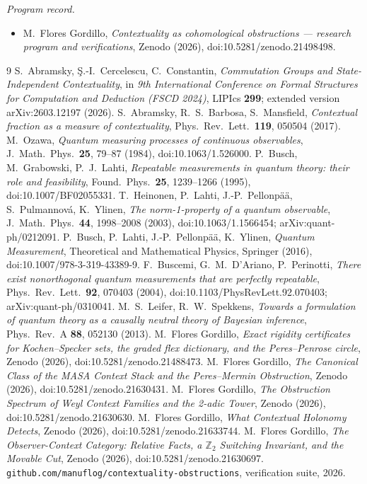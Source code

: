 \documentclass[11pt]{article}
\theoremstyle{definition}
\theoremstyle{remark}
\begin{document}
\noindent\emph{Program record.}
\begin{itemize}
\item M.~Flores Gordillo, \emph{Contextuality as cohomological obstructions --- research program and verifications}, Zenodo (2026), doi:10.5281/zenodo.21498498.
\end{itemize}

\begin{thebibliography}{9}
 S.~Abramsky, \c{S}.-I.~Cercelescu, C.~Constantin, \emph{Commutation Groups and
State-Independent Contextuality}, in \emph{9th International Conference on Formal Structures for
Computation and Deduction (FSCD 2024)}, LIPIcs \textbf{299}; extended version arXiv:2603.12197
(2026).
 S.~Abramsky, R.~S.~Barbosa, S.~Mansfield, \emph{Contextual fraction as a measure of
contextuality}, Phys.\ Rev.\ Lett.\ \textbf{119}, 050504 (2017).
 M.~Ozawa, \emph{Quantum measuring processes of continuous observables},
J.\ Math.\ Phys.\ \textbf{25}, 79--87 (1984), doi:10.1063/1.526000.
 P.~Busch, M.~Grabowski, P.~J.~Lahti, \emph{Repeatable measurements in quantum
theory: their role and feasibility}, Found.\ Phys.\ \textbf{25}, 1239--1266 (1995),
doi:10.1007/BF02055331.
 T.~Heinonen, P.~Lahti, J.-P.~Pellonp\"a\"a, S.~Pulmannov\'a, K.~Ylinen,
\emph{The norm-1-property of a quantum observable}, J.\ Math.\ Phys.\ \textbf{44}, 1998--2008
(2003), doi:10.1063/1.1566454; arXiv:quant-ph/0212091.
 P.~Busch, P.~Lahti, J.-P.~Pellonp\"a\"a, K.~Ylinen, \emph{Quantum Measurement},
Theoretical and Mathematical Physics, Springer (2016), doi:10.1007/978-3-319-43389-9.
 F.~Buscemi, G.~M.~D'Ariano, P.~Perinotti, \emph{There exist nonorthogonal quantum
measurements that are perfectly repeatable}, Phys.\ Rev.\ Lett.\ \textbf{92}, 070403 (2004),
doi:10.1103/PhysRevLett.92.070403; arXiv:quant-ph/0310041.
 M.~S.~Leifer, R.~W.~Spekkens, \emph{Towards a formulation of quantum theory as a
causally neutral theory of Bayesian inference}, Phys.\ Rev.\ A \textbf{88}, 052130 (2013).
 M.~Flores Gordillo, \emph{Exact rigidity certificates for Kochen--Specker
sets, the graded flex dictionary, and the Peres--Penrose circle}, Zenodo (2026),
doi:10.5281/zenodo.21488473.
 M.~Flores Gordillo, \emph{The Canonical Class of the MASA Context Stack and the Peres--Mermin Obstruction}, Zenodo (2026), doi:10.5281/zenodo.21630431.
 M.~Flores Gordillo, \emph{The Obstruction Spectrum of Weyl Context Families and the 2-adic Tower}, Zenodo (2026), doi:10.5281/zenodo.21630630.
 M.~Flores Gordillo, \emph{What Contextual Holonomy Detects}, Zenodo (2026), doi:10.5281/zenodo.21633744.
 M.~Flores Gordillo, \emph{The Observer-Context Category: Relative
Facts, a $\mathbb Z_2$ Switching Invariant, and the Movable Cut}, Zenodo (2026),
doi:10.5281/zenodo.21630697.
 \texttt{github.com/manuflog/contextuality-obstructions}, verification
suite, 2026.
\end{thebibliography}
\end{document}
